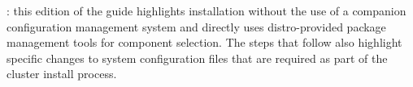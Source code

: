 : this edition of the guide highlights
installation without the use of a companion configuration management system and
directly uses distro-provided package management tools for component
selection. The steps that follow also highlight specific changes to system
configuration files that are required as part of the cluster install
process.
